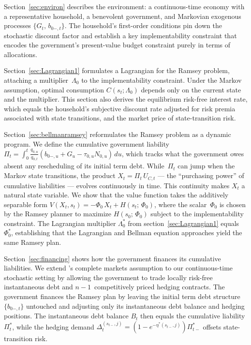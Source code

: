 \documentclass[12pt]{article}
\begin{document}

Section~\ref{sec:environ} describes the environment: a continuous-time economy with a representative household, a benevolent government, and Markovian exogenous processes $\{G_t,\, b_{0-,t}\}$.  The household's first-order conditions pin down the stochastic discount factor and establish a key  implementability constraint that encodes the government's present-value budget constraint purely in terms of allocations.  


Section~\ref{sec:Lagrangian1} formulates a Lagrangian for the Ramsey problem, attaching a multiplier~$\Lambda_0$ to the implementability constraint. Under the Markov assumption, optimal consumption $C(s_t;\Lambda_0)$ depends only on the current state  and  the  multiplier. This section also derives the equilibrium risk-free interest rate, which equals the household's subjective discount rate adjusted for risk premia associated with state transitions, and the market price of  state-transition risk.

Section~\ref{sec:bellmanramsey} reformulates the Ramsey problem as a dynamic program. We define the cumulative government liability $\Pi_t = \int_0^t \frac{q_{0,u}}{q_{0,t}} (b_{0-,u}+G_u-\tau_{0,u}N_{0,u})\, du$, which tracks what the government owes absent  any rescheduling of its  initial term debt.  While~$\Pi_t$ can  jump when the Markov state transitions, the product $X_t = \Pi_t\, U_{C,t}$ --- the ``purchasing power'' of cumulative liabilities --- evolves continuously in time. This continuity makes $X_t$ a natural state variable. We show that the value function takes the additively separable form  $V(X_t, s_t) = -\Phi_0\, X_t + H(s_t;\, \Phi_0)$, where the scalar~$\Phi_0$ is chosen by the Ramsey planner to maximize $H(s_0;\, \Phi_0)$ subject to the implementability constraint. The   Lagrangian multiplier $\Lambda_0^\ast$ from section~\ref{sec:Lagrangian1} equals $\Phi_0^\ast$, establishing  that the Lagrangian and Bellman equation approaches   yield the same Ramsey plan.


Section~\ref{sec:financing} shows how  the government finances its  cumulative liabilities. We extend \citeauthor{LucasStokey1983}'s complete markets assumption to our continuous-time stochastic setting by allowing the government to trade locally risk-free instantaneous debt and $n-1$~competitively priced hedging contracts. The government finances the Ramsey plan  by leaving the initial term debt structure $\{b_{0-,t}\}$ untouched and   adjusting  only its  instantaneous debt balance and hedging positions. The   instantaneous debt balance $B_t$ then  equals the cumulative liability $\Pi_t^\ast$, while the hedging   demand $\Delta_t^{(s_{t-},j)} = (1-e^{-\eta^\ast(s_{t-},j)})\Pi_{t-}^\ast$ offsets    state-transition risk.
\end{document}
